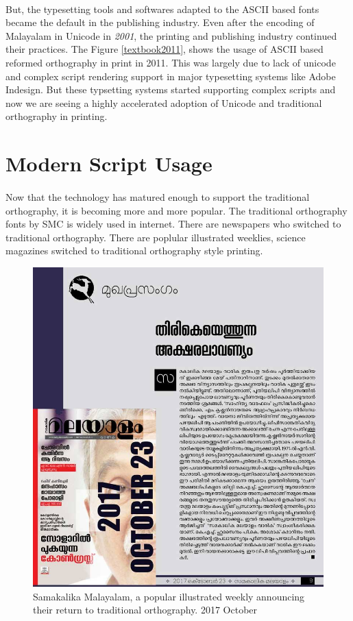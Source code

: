 \documentclass[10pt]{article}
\begin{document}
\paragraph{}
But, the typesetting tools and softwares adapted to the ASCII based fonts became the default in the publishing industry. Even after the encoding of Malayalam in Unicode in \textit{2001}, the printing and publishing industry continued their practices. The Figure \ref{textbook2011}, shows the usage of ASCII based reformed orthography in print in 2011. This was largely due to lack of unicode and complex script rendering support in major typesetting systems like Adobe Indesign. But these typsetting systems started supporting complex scripts and now we are seeing a highly accelerated adoption of Unicode and traditional orthography in printing.

\section{Modern Script Usage}
\paragraph{}
Now that the technology has matured enough to support the traditional orthography, it is becoming more and more popular. The traditional orthography fonts by SMC is widely used in internet. There are newspapers who switched to traditional orthography. There are poplular illustrated weeklies, science magazines switched to traditional orthography style printing. 

\begin{figure}[H]
	\centering
	\includegraphics[scale=0.4]{images/samakalikamalayalam.jpg}
	\caption{Samakalika Malayalam, a popular illustrated weekly announcing their return to traditional orthography. 2017 October}
\end{figure}
\end{document}
